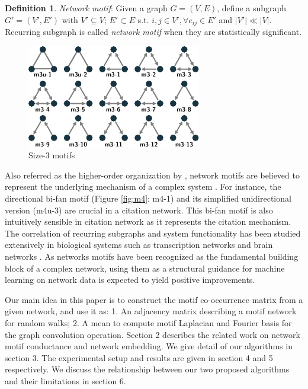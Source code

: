 \documentclass{article}
\theoremstyle{definition}
\newtheorem{definition}{Definition}[section]
\begin{document}
\begin{definition}{\emph{Network motif}}:
Given a graph $G = (V,E)$, define a subgraph $G' = (V', E')$ with $V' 
\subseteq V$;
$E' \subset E$ s.t. $i,j \in V', \forall e_{ij} \in E'$ and $|V'| \ll |V|$. 
Recurring subgraph is called \emph{network motif} when they are 
statistically significant.
\end{definition}

\begin{figure} 
    \centering
    \includegraphics[width=0.8\linewidth]{m3}
    \setlength{\belowcaptionskip}{-1em}
    \caption{Size-3 motifs}
    \label{fig:m3}
\end{figure}

Also referred as the higher-order organization by \citeauthor{juremotif}, 
network motifs are believed to represent the underlying mechanism of a 
complex system 
\cite{netmotif,mangan2003structure}. 
For instance, the directional bi-fan motif (Figure \ref{fig:m4}: m4-1)
and its simplified unidirectional version (m4u-3) are crucial in a citation 
network. This bi-fan motif is also intuitively sensible in citation network 
as it represents the citation mechanism. 
The correlation of recurring subgraphs and system 
functionality has been studied extensively in biological systems such as 
transcription networks \cite{mangan2003structure} and brain 
networks \cite{brainnetheuvel,honey2007network}. As networks motifs
have been recognized as the fundamental building block of a complex
network, using them as a structural guidance for machine learning
on network data is expected to yield positive improvements.

Our main idea in this paper is to construct the motif co-occurrence matrix
from a given network, and use it as: 1. An adjacency matrix describing a 
motif network for random walks; 2. A mean to compute motif Laplacian and 
Fourier basis for the graph convolution operation. Section 2 describes the 
related work on network motif conductance and network embedding. We give 
detail of our algorithms in section 3. The experimental setup and results 
are given in section 4 and 5 respectively. We discuss the relationship 
between our two proposed algorithms and their limitations in section 6.
\end{document}
